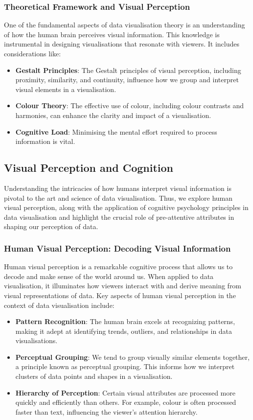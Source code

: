 \documentclass{article}\usepackage[]{graphicx}\usepackage[]{xcolor}
\begin{document}
\subsubsection{Theoretical Framework and Visual Perception}
One of the fundamental aspects of data visualisation theory is an understanding of how the human brain perceives visual information. This knowledge is instrumental in designing visualisations that resonate with viewers. It includes considerations like:
\begin{itemize}
    \item \textbf{Gestalt Principles}: The Gestalt principles of visual perception, including proximity, similarity, and continuity, influence how we group and interpret visual elements in a visualisation.
    \item \textbf{Colour Theory}: The effective use of colour, including colour contrasts and harmonies, can enhance the clarity and impact of a visualisation.
    \item \textbf{Cognitive Load}: Minimising the mental effort required to process information is vital.
\end{itemize}

\subsection{Visual Perception and Cognition}
Understanding the intricacies of how humans interpret visual information is pivotal to the art and science of data visualisation. Thus, we explore human visual perception, along with the application of cognitive psychology principles in data visualisation and highlight the crucial role of pre-attentive attributes in shaping our perception of data. 

\subsubsection{Human Visual Perception: Decoding Visual Information}
Human visual perception is a remarkable cognitive process that allows us to decode and make sense of the world around us. When applied to data visualisation, it illuminates how viewers interact with and derive meaning from visual representations of data. Key aspects of human visual perception in the context of data visualisation include:
\begin{itemize}
    \item \textbf{Pattern Recognition}: The human brain excels at recognizing patterns, making it adept at identifying trends, outliers, and relationships in data visualisations.
    \item \textbf{Perceptual Grouping}: We tend to group visually similar elements together, a principle known as perceptual grouping. This informs how we interpret clusters of data points and shapes in a visualisation.
    \item \textbf{Hierarchy of Perception}: Certain visual attributes are processed more quickly and efficiently than others. For example, colour is often processed faster than text, influencing the viewer's attention hierarchy.
\end{itemize}
\end{document}
